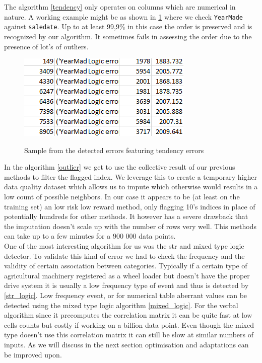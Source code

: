 \documentclass{article}
\begin{document}
The algorithm \ref{tendency} only operates on columns which are numerical in nature. A working example might be as shown in \ref{fig:exp_tendency} where we check \texttt{YearMade} against \texttt{saledate}. Up to at least 99,9\% in this case the order is preserved and is recognized by our algorithm. It sometimes fails in assessing the order due to the presence of lot's of outliers.
\begin{figure}[h]
    \centering
    \includegraphics[scale=0.5]{picture/exp_tendency.png}
    \label{fig:exp_tendency}
    \caption{Sample from the detected errors featuring tendency errors}
\end{figure}

In the algorithm \ref{outlier} we get to use the collective result of our previous methods to filter the flagged index. We leverage this to create a temporary higher data quality dataset which allows us to impute which otherwise would results in a low count of possible neighbors. In our case it appears to be (at least on the training set) an low risk low reward method, only flagging 10's indices in place of potentially hundreds for other methods. It however has a severe drawback that the imputation doesn't scale up with the number of rows very well. This methods can take up to a few minutes for a 900 000 data points.\\


One of the most interesting algorithm for us was the str and mixed type logic detector. To validate this kind of error we had to check the frequency and the validity of certain association between categories.
Typically if a certain type of agricultural machinery registered as a wheel loader but doesn't have the proper drive system it is usually a low frequency type of event and thus is detected by \ref{str_logic}.
Low frequency event, or for numerical table aberrant values can be detected using the mixed type logic algorithm \ref{mixed_logic}. For the verbal algorithm since it precomputes the correlation matrix it can be quite fast at low cells counts but costly if working on a billion data point. Even though the mixed type doesn't use this correlation matrix it can still be slow at similar numbers of inputs.
As we will discuss in the next section optimisation and adaptations can be improved upon.
\end{document}
